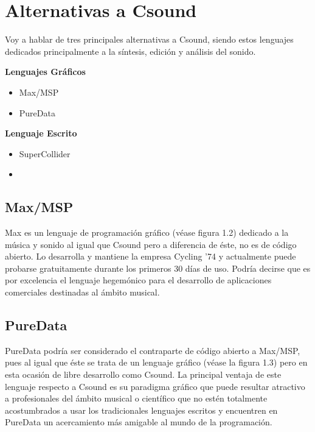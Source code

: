 \section{Alternativas a Csound}\label{sec:intro}

Voy a hablar de tres principales alternativas a Csound, siendo estos lenguajes dedicados principalmente a la síntesis, edición y análisis del sonido.\bigskip

\textbf{Lenguajes Gráficos}		
\begin{itemize}
    \item Max/MSP
    \item PureData
\end{itemize}

\textbf{Lenguaje Escrito} 
\begin{itemize}
    \item SuperCollider
    \item[\vspace{\fill}]
\end{itemize}

\subsection{Max/MSP}
Max es un lenguaje de programación gráfico (véase figura 1.2) dedicado a la música y sonido al igual que Csound pero a diferencia de éste, no es de código abierto. Lo desarrolla y mantiene la empresa Cycling '74 y actualmente puede probarse gratuitamente durante los primeros 30 días de uso.
Podría decirse que es por excelencia el lenguaje hegemónico para el desarrollo de aplicaciones comerciales destinadas al ámbito musical.

\subsection{PureData}
PureData podría ser considerado el contraparte de código abierto a Max/MSP, pues al igual que éste se trata de un lenguaje gráfico (véase la figura 1.3) pero en esta ocasión de libre desarrollo como Csound.
La principal ventaja de este lenguaje respecto a Csound es su paradigma gráfico que puede resultar atractivo a profesionales del ámbito musical o científico que no estén totalmente acostumbrados a usar los tradicionales lenguajes escritos y encuentren en PureData un acercamiento más amigable al mundo de la programación.

